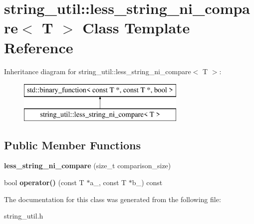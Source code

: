 \hypertarget{classstring__util_1_1less__string__ni__compare}{\section{string\+\_\+util\+:\+:less\+\_\+string\+\_\+ni\+\_\+compare$<$ T $>$ Class Template Reference}
\label{classstring__util_1_1less__string__ni__compare}
}
Inheritance diagram for string\+\_\+util\+:\+:less\+\_\+string\+\_\+ni\+\_\+compare$<$ T $>$\+:\begin{figure}[H]
\begin{center}
\leavevmode
\includegraphics[height=2.000000cm]{classstring__util_1_1less__string__ni__compare}
\end{center}
\end{figure}
\subsection*{Public Member Functions}
\begin{DoxyCompactItemize}
\item 
\hypertarget{classstring__util_1_1less__string__ni__compare_aec49bc79089ab2e54ff4752bbbabe6bf}{{\bfseries less\+\_\+string\+\_\+ni\+\_\+compare} (size\+\_\+t comparison\+\_\+size)}\label{classstring__util_1_1less__string__ni__compare_aec49bc79089ab2e54ff4752bbbabe6bf}

\item 
\hypertarget{classstring__util_1_1less__string__ni__compare_a6050f7d7b4998343cc5c46dca8b28bcc}{bool {\bfseries operator()} (const T $\ast$a\+\_\+, const T $\ast$b\+\_\+) const }\label{classstring__util_1_1less__string__ni__compare_a6050f7d7b4998343cc5c46dca8b28bcc}

\end{DoxyCompactItemize}


The documentation for this class was generated from the following file\+:\begin{DoxyCompactItemize}
\item 
string\+\_\+util.\+h\end{DoxyCompactItemize}
